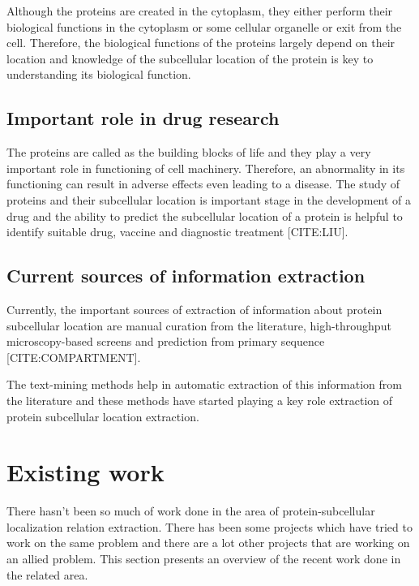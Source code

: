 Although the proteins are created in the cytoplasm, they either perform their biological functions in the cytoplasm or some cellular organelle or exit from the cell. Therefore, the biological functions of the proteins largely depend on their location and knowledge of the subcellular location of the protein is key to understanding its biological function.


\subsection*{Important role in drug research}
The proteins are called as the building blocks of life and they play a very important role in functioning of cell machinery. Therefore, an abnormality in its functioning can result in adverse effects even leading to a disease. The study of proteins and their subcellular location is important stage in the development of a drug and the ability to predict the subcellular location of a protein is helpful to identify suitable drug, vaccine and diagnostic treatment [CITE:LIU].


\subsection*{Current sources of information extraction}

Currently, the important sources of extraction of information about protein subcellular location are manual curation from the literature, high-throughput microscopy-based screens and prediction from primary sequence [CITE:COMPARTMENT].

The text-mining methods help in automatic extraction of this information from the literature and these methods have started playing a key role extraction of protein subcellular location extraction.

\section{Existing work}

There hasn't been so much of work done in the area of protein-subcellular localization relation extraction. There has been some projects which have tried to work on the same problem and there are a lot other projects that are working on an allied problem. This section presents an overview of the recent work done in the related area.


